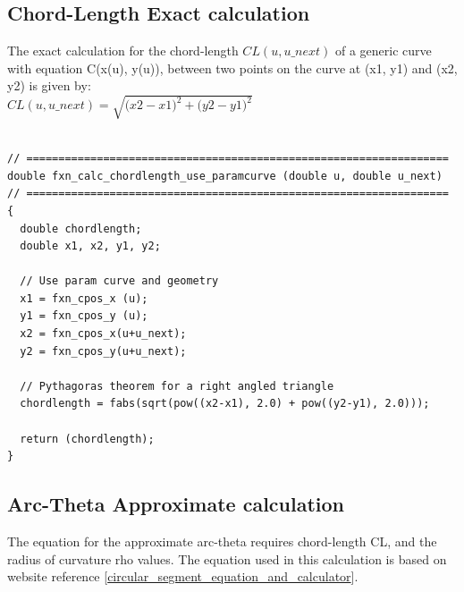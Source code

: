 \clearpage
\pagebreak

\subsection{Chord-Length Exact calculation}
\label{chap3-Chord-Length Exact calculation}

\noindent
The exact calculation for the chord-length $CL(u, u\_next)$ of a generic curve with equation C(x(u), y(u)), between two points on the curve at (x1, y1) and (x2, y2) is given by:\\

\noindent
$ CL(u, u\_next) = \sqrt{ \Bigg (x2-x1 \Bigg)^{2} + \Bigg (y2-y1 \Bigg )^{2}  } $ \\

\begin{lstlisting}[caption={Implementation of Exact Chord-length Calculation}, label=lst-Implementation of Exact Chord-length Calculation]

// ==================================================================
double fxn_calc_chordlength_use_paramcurve (double u, double u_next)
// ==================================================================
{
  double chordlength;
  double x1, x2, y1, y2;
	
  // Use param curve and geometry
  x1 = fxn_cpos_x (u);
  y1 = fxn_cpos_y (u);
  x2 = fxn_cpos_x(u+u_next);
  y2 = fxn_cpos_y(u+u_next);
	
  // Pythagoras theorem for a right angled triangle
  chordlength = fabs(sqrt(pow((x2-x1), 2.0) + pow((y2-y1), 2.0)));
	
  return (chordlength); 
}
\end{lstlisting}


\clearpage
\pagebreak

\subsection{Arc-Theta Approximate calculation}
\label{chap3-Arc-Theta Approximate calculation}

\noindent
The equation for the approximate arc-theta requires chord-length CL, and the radius of curvature rho values. The equation  used in this calculation is based on website reference [\href{https://www.engineersedge.com/math/circular_segment_equation_and_calculator__13796.htm}{circular\_segment\_equation\_and\_calculator}]. \\

